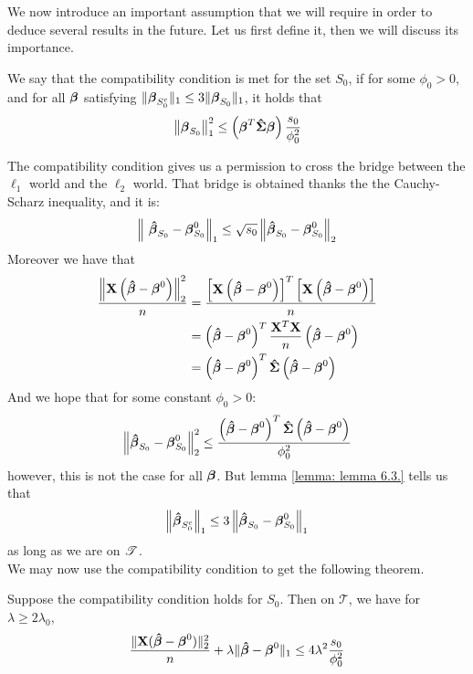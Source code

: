 We now introduce an important assumption that we will require in order to deduce several results in the future. Let us first define it, then we will discuss its importance.
\begin{definition}
    We say that the compatibility condition is met for the set $S_{0}$, if for some $\phi_{0}>0$, and for all $\boldsymbol{\beta}$ satisfying $ \|\boldsymbol{\beta}_{S_{0}^{c}} \|_{1} \leq 3 \|\boldsymbol{\beta}_{S_{0}} \|_{1}$, it holds that
    \begin{equation}
        \left\| \boldsymbol{\beta}_{S_{0}} \right\|_{1}^{2} \leq \left(\boldsymbol{\beta}^{T} \boldsymbol{\hat{\Sigma}} \boldsymbol{\beta}\right) \frac{s_{0}}{\phi_{0}^{2}}
    \end{equation}
\end{definition}
The compatibility condition gives us a permission to cross the bridge between the \(\ell_1\) world and the \(\ell_2\) world. That bridge is obtained thanks the the Cauchy-Scharz inequality, and it is:
\[
    \left\|\ \boldsymbol{\hat{\beta}}_{S_{0}} - \boldsymbol{\beta}_{S_{0}}^{0} \right\|_{1} \leq \sqrt{s_{0}}\left\|\boldsymbol{\hat{\beta}}_{S_{0}} - \boldsymbol{\beta}_{S_{0}}^{0} \right\|_{2}
\]
Moreover we have that
\begin{align*}
    \frac{\left\|\mathbf{X}\left(\boldsymbol{\hat{\beta}} - \boldsymbol{\beta}^{0}\right)\right\|_{2}^{2}}{n}
     & = \frac{\left[ \mathbf{X} \left( \boldsymbol{\hat{\beta}} - \boldsymbol{\beta}^{0}\right) \right]^T \left[\mathbf{X} \left(\boldsymbol{\hat{\beta}} - \boldsymbol{\beta}^{0}\right) \right]}{n} \\
     & = \left(\boldsymbol{\hat{\beta}} - \boldsymbol{\beta}^{0}\right)^{T} \frac{ \mathbf{X}^T \mathbf{X} }{n} \left(\boldsymbol{\hat{\beta}} - \boldsymbol{\beta}^{0}\right)                         \\
     & = \left(\boldsymbol{\hat{\beta}} - \boldsymbol{\beta}^{0}\right)^{T} \boldsymbol{\hat{\Sigma}} \left(\boldsymbol{\hat{\beta}} - \boldsymbol{\beta}^{0}\right)
\end{align*}
And we hope that for some constant \(\phi_0 > 0\):
\[
    \left\| \boldsymbol{\hat{\beta}}_{S_0} - \boldsymbol{\beta}_{S_0}^{0} \right\|_{2}^{2} \leq \frac{\left(\boldsymbol{\hat{\beta}} - \boldsymbol{\beta}^{0}\right)^{T} \boldsymbol{\hat{\Sigma}} \left(\boldsymbol{\hat{\beta}} - \boldsymbol{\beta}^{0}\right)}{\phi_0^2}
\]
however, this is not the case for all \(\boldsymbol{\beta}\). But lemma \ref{lemma: lemma 6.3.} tells us that
\[
    \left\|\boldsymbol{\hat{\beta}}_{S_{0}^{c}}\right\|_{1} \leq 3\left\|\boldsymbol{\hat{\beta}}_{S_{0}}-\boldsymbol{\beta}_{S_{0}}^{0}\right\|_{1}
\]
as long as we are on \(\mathscr{T}\). \\
We may now use the compatibility condition to get the following theorem.
\begin{theorem} %
    Suppose the compatibility condition holds for $S_{0}$. Then on $\mathscr{T}$, we have for $\lambda \geq 2 \lambda_{0}$,
    \[
        \frac{\|\mathbf{X}(\boldsymbol{\hat{\beta}}-\boldsymbol{\beta}^{0})\|_{2}^{2}}{n}+\lambda\|\boldsymbol{\hat{\beta}}-\boldsymbol{\beta}^{0}\|_{1} \leq 4 \lambda^{2} \frac{s_{0}}{\phi_{0}^{2}}
    \]
\end{theorem}
